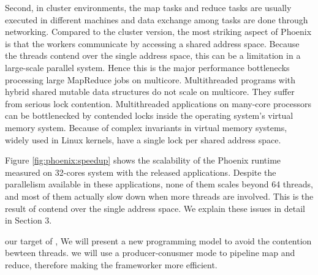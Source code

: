 Second, in cluster environments, 
the map tasks and reduce tasks are usually 
executed in different machines and data exchange among
tasks are done through networking.
Compared to the cluster version, the most striking aspect of
Phoenix is that the workers communicate by accessing a shared
address space.
Because the threads contend over the single address space,
this can be a limitation in a large-scale parallel system.
Hence this is the major performance bottlenecks processing large MapReduce jobs on multicore.
Multithreaded programs with hybrid shared mutable
data structures do not scale on multicore.
They suffer from serious lock contention.
Multithreaded applications on many-core processors can be
bottlenecked by contended locks inside the operating system’s
virtual memory system. 
Because of complex invariants in virtual memory systems, 
widely used in Linux kernels, 
have a single lock per shared address space. 
\cite{clements2013radixvm}

Figure \ref{fig:phoenix:speedup} shows the scalability of the Phoenix runtime
measured on 32-cores system with the released applications. 
Despite the parallelism available in these applications, 
none of them scales beyond 64 threads, 
and most of them actually slow down when
more threads are involved. 
This is the result of contend over the single address space. 
We explain these issues
in detail in Section 3.





{\color{red}our target of \myds, 
We will present a new programming model to avoid the contention bewteen threads.
we will use a producer-conusmer mode to pipeline map and reduce,
therefore making the frameworker more efficient.}


